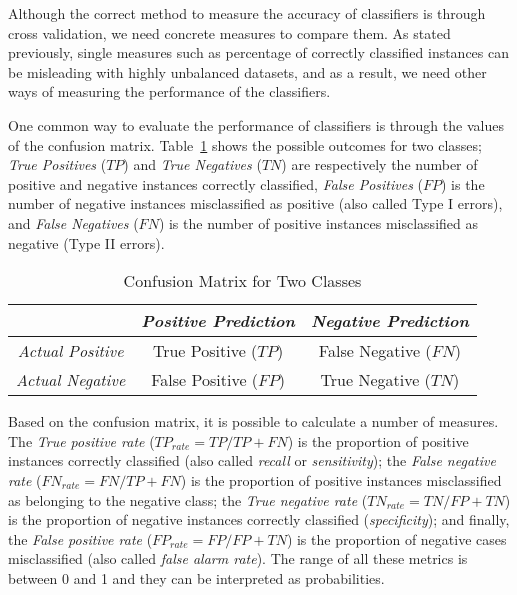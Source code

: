 \documentclass{elsart}
\begin{document}
Although the correct method to measure the accuracy of classifiers is through cross validation, we need concrete measures to compare them. As stated previously, single measures such as percentage of correctly classified instances can be misleading with highly unbalanced datasets, and as a result, we need other ways of measuring the performance of the classifiers.

One common way to evaluate the performance of classifiers is through the values of the confusion matrix. Table~\ref{tab:confMatrix} shows the possible outcomes for two classes; \emph{True Positives} ($TP$) and \emph{True Negatives }($TN$) are respectively the number of positive and negative instances correctly classified, \emph{False Positives} ($FP$) is the number of negative instances misclassified as positive (also called Type I errors), and \emph{False Negatives} ($FN$) is the number of positive instances misclassified as negative (Type II errors).

\begin{table}%
\begin{center}
\begin{small}
 \caption{Confusion Matrix for Two Classes}
\begin{tabular}{c|c|c}
  &     \emph{Positive Prediction} & \emph{Negative Prediction} \\
  \hline
  \hline
  \emph{Actual Positive} & True Positive ($TP$)  &  False Negative ($FN$) \\
  \hline
  \emph{Actual Negative} & False Positive  ($FP$) &  True Negative ($TN$)\\
  \hline
\end{tabular}
\end{small}
 \label{tab:confMatrix}
 \end{center}
\end{table}

Based on the confusion matrix, it is possible to calculate a number of measures. The \emph{True positive rate} ($TP_{rate}=TP/TP+FN$) is the proportion of positive instances correctly classified (also called \emph{recall} or \emph{sensitivity}); the \emph{False negative rate} ($FN_{rate}=FN/TP+FN$) is the proportion of positive instances misclassified as belonging to the negative class; the \emph{True negative rate} ($TN_{rate}=TN/FP+TN$) is the proportion of negative instances correctly classified (\emph{specificity}); and finally, the \emph{False positive rate} ($FP_{rate}=FP/FP+TN$) is the proportion of negative cases misclassified (also called \emph{false alarm rate}). The range of all these metrics is between 0 and 1 and they can be interpreted as probabilities.
\end{document}
